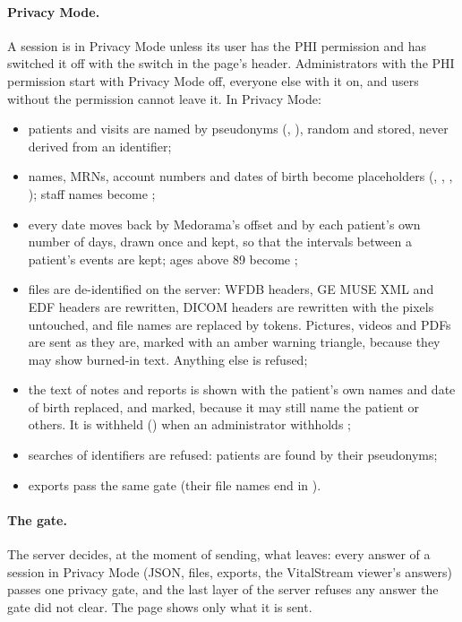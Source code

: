 \paragraph{Privacy Mode.} A session is in Privacy Mode unless its user has the PHI permission
and has switched it off with the  switch in the page's header. Administrators
with the PHI permission start with Privacy Mode off, everyone else with it on, and users without
the permission cannot leave it. In Privacy Mode:
\begin{itemize}
\item patients and visits are named by pseudonyms (,
  ), random and stored, never derived from an identifier;
\item names, MRNs, account numbers and dates of birth become placeholders
  (, \code{[MRN]}, \code{[CSN]}, ); staff names
  become ;
\item every date moves back by Medorama's offset and by each patient's own number of days,
  drawn once and kept, so that the intervals between a patient's events are kept; ages above
  89 become ;
\item files are de-identified on the server: WFDB headers, GE MUSE XML and EDF headers are
  rewritten, DICOM headers are rewritten with the pixels untouched, and file names are replaced
  by tokens. Pictures, videos and PDFs are sent as they are, marked with an amber warning
  triangle, because they may show burned-in text. Anything else is refused;
\item the text of notes and reports is shown with the patient's own names and date of birth
  replaced, and marked, because it may still name the patient or others. It is withheld
  (\code{[Withheld]}) when an administrator withholds ;
\item searches of identifiers are refused: patients are found by their pseudonyms;
\item exports pass the same gate (their file names end in ).
\end{itemize}

\paragraph{The gate.} The server decides, at the moment of sending, what leaves: every answer
of a session in Privacy Mode (JSON, files, exports, the VitalStream viewer's answers) passes
one privacy gate, and the last layer of the server refuses any answer the gate did not clear.
The page shows only what it is sent.

